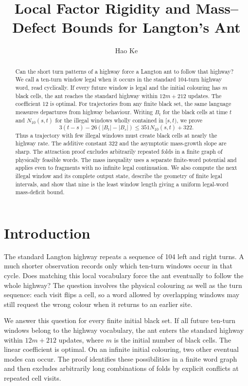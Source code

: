 \documentclass[
  11pt,
]{article}
\title{Local Factor Rigidity and Mass--Defect Bounds for Langton's Ant}
\author{Hao Ke}
\date{}
\begin{document}
\maketitle
\begin{abstract}
Can the short turn patterns of a highway force a Langton ant to follow
that highway? We call a ten-turn window legal when it occurs in the standard
104-turn highway word, read cyclically. If every future window is legal and
the initial colouring has $m$ black cells, the ant reaches the standard
highway within $12m+212$ updates. The coefficient 12 is optimal.
For trajectories from any finite black set, the same language measures
departures from highway behaviour. Writing $B_t$ for the black cells at time $t$ and
$N_{10}(s,t)$ for the illegal windows wholly contained in $[s,t)$, we prove
\[
3(t-s)-26(|B_t|-|B_s|)\le351N_{10}(s,t)+322.
\]
Thus a trajectory with few illegal windows must create black cells at nearly
the highway rate. The additive constant 322 and the asymptotic mass-growth
slope are sharp. The attraction proof excludes arbitrarily repeated folds
in a finite graph of physically feasible words. The mass inequality uses a
separate finite-word potential and applies even to fragments with no infinite
legal continuation. We also compute the next illegal window and its complete
output state, describe the geometry of finite legal intervals, and show that
nine is the least window length giving a uniform legal-word mass-deficit bound.
\end{abstract}

\section{Introduction}\label{introduction}
The standard Langton highway repeats a sequence of 104 left and right turns.
A much shorter observation records only which ten-turn windows occur in that
cycle. Does matching this local vocabulary force the ant eventually to follow
the whole highway? The question involves the physical colouring as well as the
turn sequence: each visit flips a cell, so a word allowed by overlapping
windows may still request the wrong colour when it returns to an earlier site.

We answer this question for every finite initial black set. If all future
ten-turn windows belong to the highway vocabulary, the ant enters the standard
highway within $12m+212$ updates, where $m$ is the initial number of black
cells. The linear coefficient is optimal. On an infinite initial colouring,
two other eventual modes can occur. The proof identifies these possibilities
in a finite word graph and then excludes arbitrarily long combinations of
folds by explicit conflicts at repeated cell visits.
\end{document}
